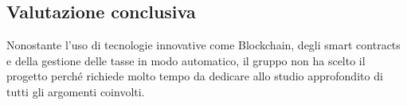     \subsection{Valutazione conclusiva}
    Nonostante l'uso di tecnologie innovative come Blockchain, degli smart contracts e della gestione delle tasse in modo automatico, il gruppo non ha scelto il progetto perché richiede molto tempo da dedicare allo studio approfondito di tutti gli argomenti coinvolti.
    